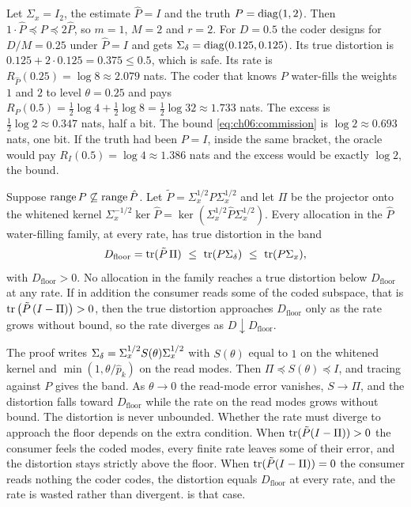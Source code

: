 \begin{example}\label{ex:ch06:commission}
Let $\Sigma_x=I_2$, the estimate $\hat P=I$ and the truth $P=\operatorname{diag}(1,2)$. Then $1\cdot\hat P\preceq P\preceq 2\hat P$, so $m=1$, $M=2$ and $r=2$. For $D=0.5$ the coder designs for $D/M=0.25$ under $\hat P=I$ and gets $\Sigma_\delta=\operatorname{diag}(0.125,0.125)$. Its true distortion is $0.125+2\cdot0.125=0.375\le0.5$, which is safe. Its rate is $R_{\hat P}(0.25)=\log 8\approx2.079$ nats. The coder that knows $P$ water-fills the weights $1$ and $2$ to level $\theta=0.25$ and pays $R_P(0.5)=\tfrac12\log4+\tfrac12\log8=\tfrac12\log32\approx1.733$ nats. The excess is $\tfrac12\log2\approx0.347$ nats, half a bit. The bound \cref{eq:ch06:commission} is $\log2\approx0.693$ nats, one bit. If the truth had been $P=I$, inside the same bracket, the oracle would pay $R_I(0.5)=\log4\approx1.386$ nats and the excess would be exactly $\log2$, the bound.
\end{example}

\begin{theorem}\label{thm:ch06:omission}
Suppose $\operatorname{range} P\not\subseteq\operatorname{range}\hat P$. Let $\tilde P=\Sigma_x^{1/2}P\Sigma_x^{1/2}$ and let $\Pi$ be the projector onto the whitened kernel $\Sigma_x^{-1/2}\ker\hat P=\ker(\Sigma_x^{1/2}\hat P\Sigma_x^{1/2})$. Every allocation in the $\hat P$ water-filling family, at every rate, has true distortion in the band
\begin{equation}\label{eq:ch06:omission}
D_{\mathrm{floor}}=\tr(\tilde P\,\Pi)\ \le\ \tr(P\Sd)\ \le\ \tr(P\Sigma_x),
\end{equation}
with $D_{\mathrm{floor}}>0$. No allocation in the family reaches a true distortion below $D_{\mathrm{floor}}$ at any rate. If in addition the consumer reads some of the coded subspace, that is $\operatorname{tr}\big(\tilde P\,(I-\Pi)\big)>0$, then the true distortion approaches $D_{\mathrm{floor}}$ only as the rate grows without bound, so the rate diverges as $D\downarrow D_{\mathrm{floor}}$.
\end{theorem}

The proof writes $\Sigma_\delta=\Sigma_x^{1/2}S(\theta)\Sigma_x^{1/2}$ with $S(\theta)$ equal to $1$ on the whitened kernel and $\min(1,\theta/\hat p_k)$ on the read modes. Then $\Pi\preceq S(\theta)\preceq I$, and tracing against $P$ gives the band. As $\theta\to0$ the read-mode error vanishes, $S\to\Pi$, and the distortion falls toward $D_{\mathrm{floor}}$ while the rate on the read modes grows without bound. The distortion is never unbounded. Whether the rate must diverge to approach the floor depends on the extra condition. When $\operatorname{tr}(\tilde P(I-\Pi))>0$ the consumer feels the coded modes, every finite rate leaves some of their error, and the distortion stays strictly above the floor. When $\operatorname{tr}(\tilde P(I-\Pi))=0$ the consumer reads nothing the coder codes, the distortion equals $D_{\mathrm{floor}}$ at every rate, and the rate is wasted rather than divergent.  is that case.

